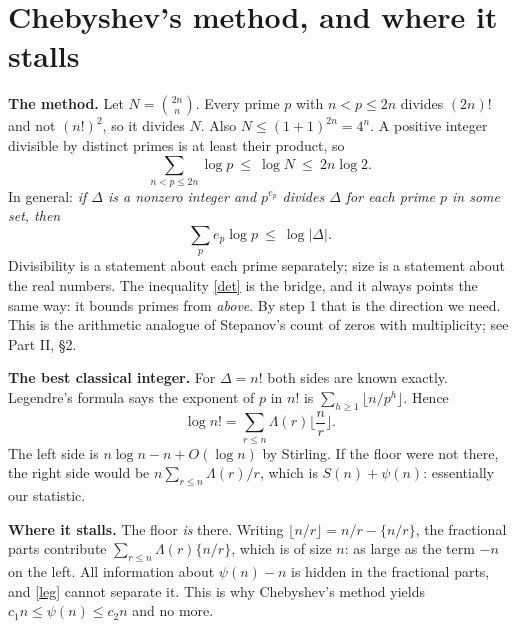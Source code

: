 \documentclass[11pt,letterpaper]{article}
\begin{document}
\section{Chebyshev's method, and where it stalls}

\textbf{The method.} Let $N=\binom{2n}{n}$. Every prime $p$ with $n<p\le2n$ divides $(2n)!$ and not
$(n!)^2$, so it divides $N$. Also $N\le(1+1)^{2n}=4^n$. A positive integer divisible by distinct primes is at
least their product, so
\begin{equation}\label{D:5}
 \sum_{n<p\le2n}\log p\ \le\ \log N\ \le\ 2n\log 2 .
\end{equation}
In general: \emph{if $\Delta$ is a nonzero integer and $p^{e_p}$ divides $\Delta$ for each prime $p$ in some
set, then}
\begin{equation}\label{det}
 \sum_p e_p\log p\ \le\ \log|\Delta| .
\end{equation}
Divisibility is a statement about each prime separately; size is a statement about the real numbers. The
inequality \eqref{det} is the bridge, and it always points the same way: it bounds primes from \emph{above}.
By step 1 that is the direction we need. This is the arithmetic analogue of Stepanov's count of zeros with
multiplicity; see Part II, \S2.

\textbf{The best classical integer.} For $\Delta=n!$ both sides are known exactly. Legendre's formula \cite{Leg08} says
the exponent of $p$ in $n!$ is $\sum_{h\ge1}\lfloor n/p^h\rfloor$. Hence
\begin{equation}\label{leg}
 \log n!=\sum_{r\le n}\Lambda(r)\Big\lfloor\frac nr\Big\rfloor .
\end{equation}
The left side is $n\log n-n+O(\log n)$ by Stirling. If the floor were not there, the right side would be
$n\sum_{r\le n}\Lambda(r)/r$, which is $S(n)+\psi(n)$: essentially our statistic.

\textbf{Where it stalls.} The floor \emph{is} there. Writing $\lfloor n/r\rfloor=n/r-\{n/r\}$, the
fractional parts contribute $\sum_{r\le n}\Lambda(r)\{n/r\}$, which is of size $n$: as large as the term
$-n$ on the left. All information about $\psi(n)-n$ is hidden in the fractional parts, and \eqref{leg}
cannot separate it. This is why Chebyshev's method yields $c_1n\le\psi(n)\le c_2n$ and no more.
\end{document}
